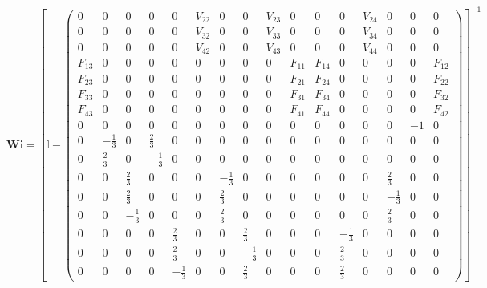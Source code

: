 \[ \mathbf{Wi} =  \left[ \mathbb{I}  - \left(\begin{smallmatrix} 0 & 0
& 0 & 0 & 0 & V_{22} & 0 & 0 & V_{23} & 0 & 0 & 0 & V_{24} & 0 & 0 & 0
\\ 0 & 0 & 0 & 0 & 0 & V_{32} & 0 & 0 & V_{33} & 0 & 0 & 0 & V_{34} &
0 & 0 & 0 \\ 0 & 0 & 0 & 0 & 0 & V_{42} & 0 & 0 & V_{43} & 0 & 0 & 0 &
V_{44} & 0 & 0 & 0 \\ F_{13} & 0 & 0 & 0 & 0 & 0 & 0 & 0 & 0 & F_{11}
& F_{14} & 0 & 0 & 0 & 0 & F_{12} \\ F_{23} & 0 & 0 & 0 & 0 & 0 & 0 &
0 & 0 & F_{21} & F_{24} & 0 & 0 & 0 & 0 & F_{22} \\ F_{33} & 0 & 0 & 0
& 0 & 0 & 0 & 0 & 0 & F_{31} & F_{34} & 0 & 0 & 0 & 0 & F_{32} \\
F_{43} & 0 & 0 & 0 & 0 & 0 & 0 & 0 & 0 & F_{41} & F_{44} & 0 & 0 & 0 &
0 & F_{42} \\ 0 & 0 & 0 & 0 & 0 & 0 & 0 & 0 & 0 & 0 & 0 & 0 & 0 & 0 &
-1 & 0 \\ 0 & -\frac{1}{3} & 0 & \frac{2}{3} & 0 & 0 & 0 & 0 & 0 & 0 &
0 & 0 & 0 & 0 & 0 & 0 \\ 0 & \frac{2}{3} & 0 & -\frac{1}{3} & 0 & 0 &
0 & 0 & 0 & 0 & 0 & 0 & 0 & 0 & 0 & 0 \\ 0 & 0 & \frac{2}{3} & 0 & 0 &
0 & -\frac{1}{3} & 0 & 0 & 0 & 0 & 0 & 0 & \frac{2}{3} & 0 & 0 \\ 0 &
0 & \frac{2}{3} & 0 & 0 & 0 & \frac{2}{3} & 0 & 0 & 0 & 0 & 0 & 0 &
-\frac{1}{3} & 0 & 0 \\ 0 & 0 & -\frac{1}{3} & 0 & 0 & 0 & \frac{2}{3}
& 0 & 0 & 0 & 0 & 0 & 0 & \frac{2}{3} & 0 & 0 \\ 0 & 0 & 0 & 0 &
\frac{2}{3} & 0 & 0 & \frac{2}{3} & 0 & 0 & 0 & -\frac{1}{3} & 0 & 0 &
0 & 0 \\ 0 & 0 & 0 & 0 & \frac{2}{3} & 0 & 0 & -\frac{1}{3} & 0 & 0 &
0 & \frac{2}{3} & 0 & 0 & 0 & 0 \\ 0 & 0 & 0 & 0 & -\frac{1}{3} & 0 &
0 & \frac{2}{3} & 0 & 0 & 0 & \frac{2}{3} & 0 & 0 & 0 & 0
\end{smallmatrix}\right) \right]^{-1}  \]
